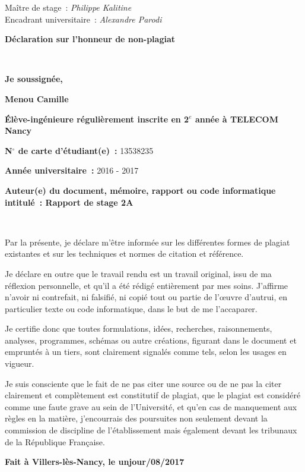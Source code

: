 \documentclass[12pt]{article}
\begin{document}
{\raggedright
Maître de stage~: \textit{Philippe Kalitine}
\\
Encadrant universitaire~: \textit{Alexandre Parodi}\pagebreak{}
}

\begin{center}
\textbf{{\huge Déclaration sur l'honneur de non-plagiat}}
\thispagestyle{empty}
\end{center}

$ $

\textbf{Je soussignée,}

\textbf{Menou Camille}

\textbf{\'{E}lève-ingénieure régulièrement inscrite en 2$^{e}$
année à TELECOM Nancy}

\textbf{N$^\circ{}$ de carte d'étudiant(e)~:} 13538235

\textbf{Année universitaire~:} 2016 - 2017

\textbf{Auteur(e) du document, m\'{e}moire, rapport ou code informatique
intitul\'{e}~: Rapport de stage 2A}

$ $


Par la présente, je déclare m'être informée sur les
différentes formes de plagiat existantes et sur les techniques et normes de
citation et référence.

Je déclare en outre que le travail rendu est un travail original, issu de ma
réflexion personnelle, et qu'il a été rédigé entièrement
par mes soins. J'affirme n'avoir ni contrefait, ni falsifié, ni copié
tout ou partie de l'\oe{}uvre d'autrui, en particulier texte ou code
informatique, dans le but de me l'accaparer.

Je certifie donc que toutes formulations, idées, recherches, raisonnements,
analyses, programmes, schémas ou autre créations, figurant dans le
document et empruntés à un tiers, sont clairement signalés comme
tels, selon les usages en vigueur.

Je suis consciente que le fait de ne pas citer une source ou de ne pas la
citer clairement et complètement est constitutif de plagiat, que le plagiat est
considéré comme une faute grave au sein de l'Université, et qu'en cas
de manquement aux règles en la matière, j'encourrais des poursuites non
seulement devant la commission de discipline de l'établissement mais
également devant les tribunaux de la République Française.

\begin{center}
\textbf{Fait à Villers-lès-Nancy, le unjour/08/2017}
\end{center}
\thispagestyle{empty}
\end{document}
